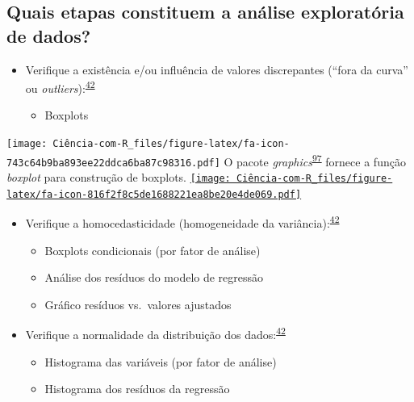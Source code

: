 \documentclass[
]{book}
\providecommand{\tightlist}{%
  \setlength{\itemsep}{0pt}\setlength{\parskip}{0pt}}
\begin{document}
\hypertarget{quais-etapas-constituem-a-anuxe1lise-exploratuxf3ria-de-dados}{%
\subsection{Quais etapas constituem a análise exploratória de dados?}\label{quais-etapas-constituem-a-anuxe1lise-exploratuxf3ria-de-dados}}

\begin{itemize}
\item
  Verifique a existência e/ou influência de valores discrepantes (``fora da curva'' ou \emph{outliers}):\textsuperscript{\protect\hyperlink{ref-zuur2009}{42}}

  \begin{itemize}
  \tightlist
  \item
    Boxplots
  \end{itemize}
\end{itemize}

\texttt{[image: Ciência-com-R\_files/figure-latex/fa-icon-743c64b9ba893ee22ddca6ba87c98316.pdf]} O pacote \emph{graphics}\textsuperscript{\protect\hyperlink{ref-graphics}{97}} fornece a função \emph{boxplot} para construção de boxplots. \href{https://www.rdocumentation.org/packages/graphics/versions/3.6.2/topics/boxplot}{\texttt{[image: Ciência-com-R\_files/figure-latex/fa-icon-816f2f8c5de1688221ea8be20e4de069.pdf]}}

\begin{itemize}
\item
  Verifique a homocedasticidade (homogeneidade da variância):\textsuperscript{\protect\hyperlink{ref-zuur2009}{42}}

  \begin{itemize}
  \item
    Boxplots condicionais (por fator de análise)
  \item
    Análise dos resíduos do modelo de regressão
  \item
    Gráfico resíduos vs.~valores ajustados
  \end{itemize}
\end{itemize}

\begin{itemize}
\item
  Verifique a normalidade da distribuição dos dados:\textsuperscript{\protect\hyperlink{ref-zuur2009}{42}}

  \begin{itemize}
  \item
    Histograma das variáveis (por fator de análise)
  \item
    Histograma dos resíduos da regressão
  \end{itemize}
\end{itemize}
\end{document}
